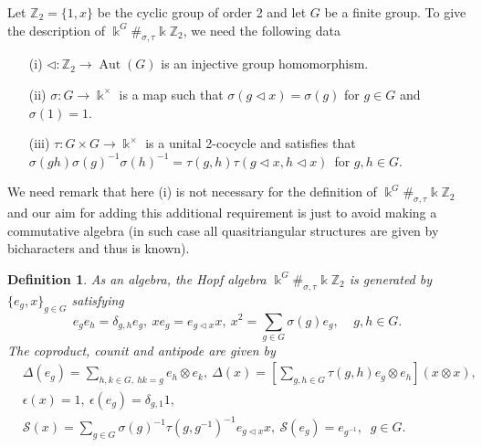 \documentclass[a4paper,11pt]{amsart}
\def \Aut{\operatorname{Aut}}
\numberwithin{equation}{section}
\newtheorem{definition}[theorem]{Definition}
\begin{document}
Let $\mathbb{Z}_2=\{1,x\}$ be the cyclic group of order 2 and let $G$ be a finite group. To give the description of $\Bbbk^G\#_{\sigma,\tau}\Bbbk \mathbb{Z}_{2}$, we need the following data
\begin{itemize}
\item[(i)] $\triangleleft :\mathbb{Z}_2 \rightarrow \Aut(G)$ is an injective group homomorphism.
\item[(ii)] $\sigma:G\rightarrow \Bbbk^\times$ is a map such that $\sigma(g\triangleleft x)=\sigma(g)$ for $g \in G$ and $\sigma(1)=1$.
\item[(iii)] $\tau:G\times G \rightarrow \Bbbk^\times$ is a unital 2-cocycle and satisfies that $\sigma(gh)\sigma(g)^{-1}\sigma(h)^{-1}=\tau(g,h)\tau(g\triangleleft x,h\triangleleft x)$\ for $g,h \in G$.
\end{itemize}
We need remark that here (i) is not necessary for the definition of $\Bbbk^G\#_{\sigma,\tau}\Bbbk \mathbb{Z}_{2}$ and our aim for adding this additional requirement is just to avoid making a commutative algebra (in such case all quasitriangular structures are given by bicharacters and thus is known).
\begin{definition}\cite[Section 2.2]{AA}\label{def2.1.2}
As an algebra, the Hopf algebra $\Bbbk^G\#_{\sigma,\tau}\Bbbk \mathbb{Z}_{2}$ is generated by $\{ e_{g},x \}_{g \in G}$  satisfying
 \begin{equation*}
 e_{g}e_{h}=\delta_{g,h}e_{g},\ xe_{g}=e_{g\triangleleft x}x,\ x^2=\sum\limits_{g \in G}\sigma(g)e_{g}, \;\;\;\;g,h\in G.
 \end{equation*}
 The coproduct, counit and antipode are given by
 \begin{align*}
 &\Delta (e_{g})=\sum_{ h,k \in G,\ hk=g} e_{h}\otimes e_{k},\ \Delta(x)=[\sum\limits_{g,h \in G}\tau(g,h)e_{g}\otimes e_{h}](x\otimes x),\\
  &\epsilon(x)=1,\ \epsilon(e_{g})=\delta_{g,1}1,\\
   &\mathcal{S}(x)=\sum_{g\in G}\sigma(g)^{-1}\tau(g,g^{-1})^{-1}e_{g\triangleleft x}x,\ \mathcal{S}(e_g)=e_{g^{-1}},\;\;g\in G.
 \end{align*}
\end{definition}
\end{document}
